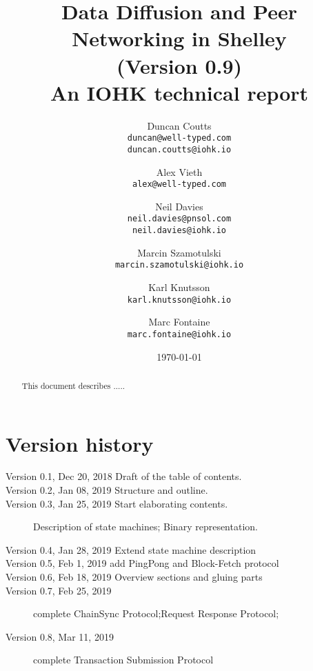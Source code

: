 \documentclass{report}
\theoremstyle{definition}{
  \newtheorem{lemma}{Lemma}[section] %
  \newtheorem{definition}[lemma]{Definition}
}
\theoremstyle{theorem}{
  \newtheorem{invariant}[lemma]{Invariant}
  \newtheorem{proofobligation}[lemma]{Proof Obligation}
}
\numberwithin{equation}{lemma}
\begin{document}
\title{Data Diffusion and Peer Networking in Shelley\\
       {\small (Version 0.9)} \\
       {\large \sc An IOHK technical report}}
\author{Duncan Coutts \\ {\small \texttt{duncan@well-typed.com}} \\
                         {\small \texttt{duncan.coutts@iohk.io}}
   \and Alex Vieth \\ {\small \texttt{alex@well-typed.com}}
   \and Neil Davies \\ {\small \texttt{neil.davies@pnsol.com}} \\
                       {\small \texttt{neil.davies@iohk.io}}
   \and Marcin Szamotulski \\ {\small \texttt{marcin.szamotulski@iohk.io}}
   \and Karl Knutsson \\ {\small \texttt{karl.knutsson@iohk.io}}
   \and Marc Fontaine \\ {\small \texttt{marc.fontaine@iohk.io}}
   }
\date{\today}

\maketitle

\begin{abstract}
  This document describes .....
\end{abstract}

\tableofcontents

\section*{Version history}

\begin{description}
\item[Version 0.1, Dec 20, 2018  Draft of the table of contents.]
\item[Version 0.2, Jan 08, 2019 Structure and outline.]
\item[Version 0.3, Jan 25, 2019 Start elaborating contents.]
  Description of state machines; Binary representation.
\item[Version 0.4, Jan 28, 2019 Extend state machine description]
\item[Version 0.5, Feb 1,  2019  add PingPong and Block-Fetch protocol]
\item[Version 0.6, Feb 18, 2019  Overview sections and gluing parts]
\item[Version 0.7, Feb 25, 2019 ]
  complete ChainSync Protocol;Request Response Protocol;
\item[Version 0.8, Mar 11, 2019 ]
  complete Transaction Submission Protocol
\end{description}
\end{document}
